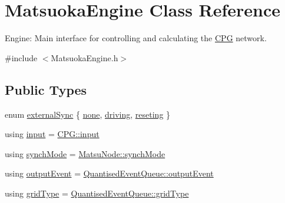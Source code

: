 \hypertarget{classMatsuokaEngine}{}\section{Matsuoka\+Engine Class Reference}
\label{classMatsuokaEngine}


Engine\+: Main interface for controlling and calculating the \mbox{\hyperlink{classCPG}{C\+PG}} network.  




{\ttfamily \#include $<$Matsuoka\+Engine.\+h$>$}

\subsection*{Public Types}
\begin{DoxyCompactItemize}
\item 
enum \mbox{\hyperlink{classMatsuokaEngine_ad8f471b2f1ca479174d5514b9a3597ec}{external\+Sync}} \{ \mbox{\hyperlink{classMatsuokaEngine_ad8f471b2f1ca479174d5514b9a3597eca4c1d8f9abc3142b344a24624ea7c0a96}{none}}, 
\mbox{\hyperlink{classMatsuokaEngine_ad8f471b2f1ca479174d5514b9a3597ecaf17848b3aa2effcdfd4576b7723ffc7b}{driving}}, 
\mbox{\hyperlink{classMatsuokaEngine_ad8f471b2f1ca479174d5514b9a3597eca66dfc95cb0e1248f30385a100203920c}{reseting}}
 \}
\item 
using \mbox{\hyperlink{classMatsuokaEngine_a811a5449f07004a2eb6b34e8c9bd862f}{input}} = \mbox{\hyperlink{structCPG_1_1input}{C\+P\+G\+::input}}
\item 
using \mbox{\hyperlink{classMatsuokaEngine_acbf2fcb6ddd3b8edc414753248b95fc2}{synch\+Mode}} = \mbox{\hyperlink{classMatsuNode_a725e228db39b8842f851ddf88f640bed}{Matsu\+Node\+::synch\+Mode}}
\item 
using \mbox{\hyperlink{classMatsuokaEngine_a09035e4918ce82c9378821c88375f843}{output\+Event}} = \mbox{\hyperlink{structQuantisedEventQueue_1_1outputEvent}{Quantised\+Event\+Queue\+::output\+Event}}
\item 
using \mbox{\hyperlink{classMatsuokaEngine_aaf41ce5bf63099a1d864e4eb91527cb5}{grid\+Type}} = \mbox{\hyperlink{classQuantisedEventQueue_ae186d50bd503038452edbbdd0c7c259e}{Quantised\+Event\+Queue\+::grid\+Type}}
\end{DoxyCompactItemize}
